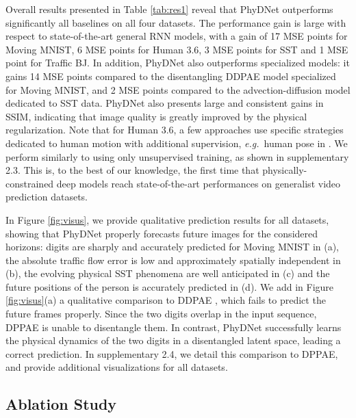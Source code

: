 \documentclass[10pt,twocolumn,letterpaper]{article}
\def\eg{\textit{e.g.}~}
\begin{document}
Overall results presented in Table \ref{tab:res1} reveal that PhyDNet outperforms significantly all baselines on all four datasets. The performance gain is large with respect to state-of-the-art general RNN models, with a gain of 17 MSE points for Moving MNIST, 6 MSE points for Human 3.6, 3 MSE points for SST and 1 MSE point for Traffic BJ. In addition, PhyDNet also outperforms specialized models: it gains 14 MSE points compared to the disentangling DDPAE model \cite{hsieh2018learning} specialized for Moving MNIST, and 2 MSE points compared to the advection-diffusion model \cite{de2017deep} dedicated to SST data. PhyDNet also presents large and consistent gains in SSIM, indicating that image quality is greatly improved by the physical regularization. Note that for Human 3.6, a few approaches use specific strategies dedicated to human motion with additional supervision, \eg human pose in \cite{villegas2017learning}. We perform similarly to \cite{villegas2017learning} using only unsupervised training, as shown in supplementary 2.3. This is, to the best of our knowledge, the first time that physically-constrained deep models reach state-of-the-art performances on generalist video prediction datasets.



In Figure \ref{fig:visus}, we provide qualitative prediction results for all datasets, showing that PhyDNet properly forecasts future images for the considered horizons: digits are sharply and accurately predicted for Moving MNIST in (a), the absolute traffic flow error is low and approximately spatially independent in (b), the evolving physical SST phenomena are well anticipated in (c) and the future positions of the person is accurately predicted in (d). We add in Figure \ref{fig:visus}(a) a qualitative comparison to DDPAE \cite{hsieh2018learning}, which fails to predict the future frames properly. Since the two digits overlap in the input sequence, DPPAE is unable to disentangle them. In contrast, PhyDNet successfully learns the physical dynamics of the two digits in a disentangled latent space, leading a correct prediction. In supplementary 2.4, we detail this comparison to DPPAE, and provide additional visualizations for all datasets. 








\subsection{Ablation Study}
\end{document}
